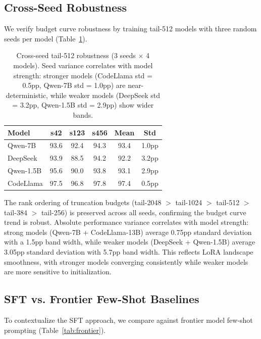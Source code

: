 \documentclass[11pt,a4paper]{article}
\begin{document}
\subsection{Cross-Seed Robustness}
\label{sec:seeds}

We verify budget curve robustness by training tail-512 models with three random seeds per model (Table~\ref{tab:seeds}).

\begin{table}[t]
\centering
\small
\begin{tabular}{lccccc}
\toprule
\textbf{Model} & \textbf{s42} & \textbf{s123} & \textbf{s456} & \textbf{Mean} & \textbf{Std} \\
\midrule
Qwen-7B & 93.6 & 92.4 & 94.3 & 93.4 & 1.0pp \\
DeepSeek & 93.9 & 88.5 & 94.2 & 92.2 & 3.2pp \\
Qwen-1.5B & 95.6 & 90.0 & 93.8 & 93.1 & 2.9pp \\
CodeLlama & 97.5 & 96.8 & 97.8 & 97.4 & 0.5pp \\
\bottomrule
\end{tabular}
\caption{Cross-seed tail-512 robustness (3 seeds $\times$ 4 models). Seed variance correlates with model strength: stronger models (CodeLlama std = 0.5pp, Qwen-7B std = 1.0pp) are near-deterministic, while weaker models (DeepSeek std = 3.2pp, Qwen-1.5B std = 2.9pp) show wider bands.}
\label{tab:seeds}
\end{table}

The rank ordering of truncation budgets (tail-2048 $>$ tail-1024 $>$ tail-512 $>$ tail-384 $>$ tail-256) is preserved across all seeds, confirming the budget curve trend is robust. Absolute performance variance correlates with model strength: strong models (Qwen-7B + CodeLlama-13B) average 0.75pp standard deviation with a 1.5pp band width, while weaker models (DeepSeek + Qwen-1.5B) average 3.05pp standard deviation with 5.7pp band width. This reflects LoRA landscape smoothness, with stronger models converging consistently while weaker models are more sensitive to initialization.

\subsection{SFT vs. Frontier Few-Shot Baselines}
\label{sec:frontier}

To contextualize the SFT approach, we compare against frontier model few-shot prompting (Table~\ref{tab:frontier}).
\end{document}
